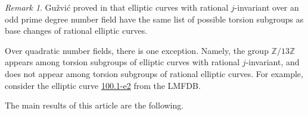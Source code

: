 \documentclass[10pt,leqno]{amsart}
\newcommand{\Z}{\mathbb{Z}}
\newcommand{\Q}{\mathbb{Q}}
\theoremstyle{definition}
\theoremstyle{remark}
\newtheorem{remark}[theorem]{Remark}
\numberwithin{theorem}{section}
\begin{document}
    







\begin{remark}
    Gužvić proved in \cite[Theorem 5.1.2]{guzvic2021torsion} that elliptic curves with rational $j$-invariant over an odd prime degree number field have the same list of possible torsion subgroups as base changes of rational elliptic curves. 
    
    Over quadratic number fields, there is one exception. Namely, the group $\Z/13\Z$ appears among torsion subgroups of elliptic curves with rational $j$-invariant, and does not appear among torsion subgroups of rational elliptic curves. For example, consider the elliptic curve \hyperlink{https://www.lmfdb.org/EllipticCurve/2.2.17.1/100.1/e/2}{100.1-e2} from the LMFDB.
\end{remark}


The main results of this article are the following.
\end{document}
